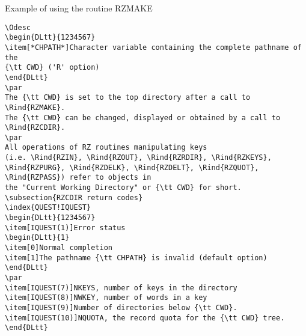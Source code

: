 \begin{XMPt}{Example of using the routine RZMAKE}
\begin{verbatim}
\Odesc
\begin{DLtt}{1234567}
\item[*CHPATH*]Character variable containing the complete pathname of the
{\tt CWD} ('R' option)
\end{DLtt}
\par 
The {\tt CWD} is set to the top directory after a call to \Rind{RZMAKE}.
The {\tt CWD} can be changed, displayed or obtained by a call to \Rind{RZCDIR}.
\par 
All operations of RZ routines manipulating keys
(i.e. \Rind{RZIN}, \Rind{RZOUT}, \Rind{RZRDIR}, \Rind{RZKEYS},
\Rind{RZPURG}, \Rind{RZDELK}, \Rind{RZDELT}, \Rind{RZQUOT},
\Rind{RZPASS}) refer to objects in
the "Current Working Directory" or {\tt CWD} for short.
\subsection{RZCDIR return codes}
\index{QUEST!IQUEST}
\begin{DLtt}{1234567}
\item[IQUEST(1)]Error status
\begin{DLtt}{1}
\item[0]Normal completion
\item[1]The pathname {\tt CHPATH} is invalid (default option)
\end{DLtt}
\par
\item[IQUEST(7)]NKEYS, number of keys in the directory
\item[IQUEST(8)]NWKEY, number of words in a key
\item[IQUEST(9)]Number of directories below {\tt CWD}.
\item[IQUEST(10)]NQUOTA, the record quota for the {\tt CWD} tree.
\end{DLtt}

\end{verbatim}
\end{XMPt}
